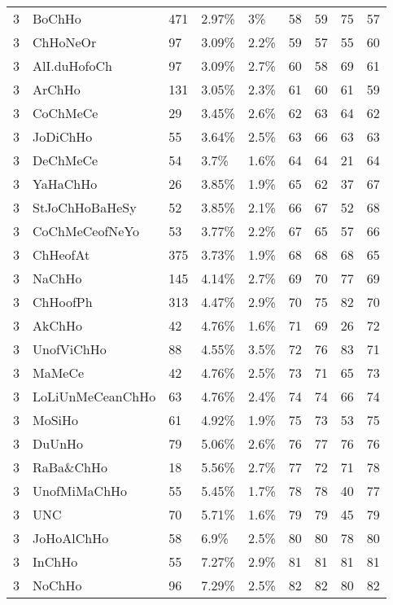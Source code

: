 \begin{longtable}{lllllrrrr}
  3 & BoChHo & 471 & 2.97\% & 3\% &  58 &  59 &  75 &  57 \\ 
  3 & ChHoNeOr & 97 & 3.09\% & 2.2\% &  59 &  57 &  55 &  60 \\ 
  3 & AlI.duHofoCh & 97 & 3.09\% & 2.7\% &  60 &  58 &  69 &  61 \\ 
  3 & ArChHo & 131 & 3.05\% & 2.3\% &  61 &  60 &  61 &  59 \\ 
  3 & CoChMeCe & 29 & 3.45\% & 2.6\% &  62 &  63 &  64 &  62 \\ 
  3 & JoDiChHo & 55 & 3.64\% & 2.5\% &  63 &  66 &  63 &  63 \\ 
  3 & DeChMeCe & 54 & 3.7\% & 1.6\% &  64 &  64 &  21 &  64 \\ 
  3 & YaHaChHo & 26 & 3.85\% & 1.9\% &  65 &  62 &  37 &  67 \\ 
  3 & StJoChHoBaHeSy & 52 & 3.85\% & 2.1\% &  66 &  67 &  52 &  68 \\ 
  3 & CoChMeCeofNeYo & 53 & 3.77\% & 2.2\% &  67 &  65 &  57 &  66 \\ 
  3 & ChHeofAt & 375 & 3.73\% & 1.9\% &  68 &  68 &  68 &  65 \\ 
  3 & NaChHo & 145 & 4.14\% & 2.7\% &  69 &  70 &  77 &  69 \\ 
  3 & ChHoofPh & 313 & 4.47\% & 2.9\% &  70 &  75 &  82 &  70 \\ 
  3 & AkChHo & 42 & 4.76\% & 1.6\% &  71 &  69 &  26 &  72 \\ 
  3 & UnofViChHo & 88 & 4.55\% & 3.5\% &  72 &  76 &  83 &  71 \\ 
  3 & MaMeCe & 42 & 4.76\% & 2.5\% &  73 &  71 &  65 &  73 \\ 
  3 & LoLiUnMeCeanChHo & 63 & 4.76\% & 2.4\% &  74 &  74 &  66 &  74 \\ 
  3 & MoSiHo & 61 & 4.92\% & 1.9\% &  75 &  73 &  53 &  75 \\ 
  3 & DuUnHo & 79 & 5.06\% & 2.6\% &  76 &  77 &  76 &  76 \\ 
  3 & RaBa\&ChHo & 18 & 5.56\% & 2.7\% &  77 &  72 &  71 &  78 \\ 
  3 & UnofMiMaChHo & 55 & 5.45\% & 1.7\% &  78 &  78 &  40 &  77 \\ 
  3 & UNC & 70 & 5.71\% & 1.6\% &  79 &  79 &  45 &  79 \\ 
  3 & JoHoAlChHo & 58 & 6.9\% & 2.5\% &  80 &  80 &  78 &  80 \\ 
  3 & InChHo & 55 & 7.27\% & 2.9\% &  81 &  81 &  81 &  81 \\ 
  3 & NoChHo & 96 & 7.29\% & 2.5\% &  82 &  82 &  80 &  82 \\ 

\end{longtable}
